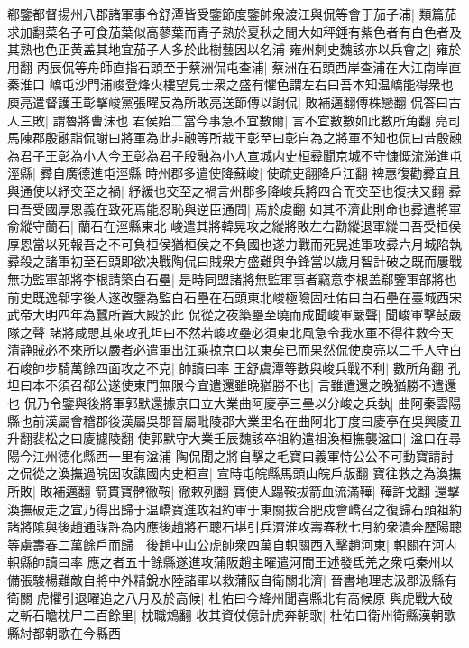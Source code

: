 郗鑒都督揚州八郡諸軍事令舒潭皆受鑒節度鑒帥衆渡江與侃等會于茄子浦|{
	類篇茄求加翻菜名子可食茄葉似高蓼葉而青子熟於夏秋之間大如秤錘有紫色者有白色者及其熟也色正黄盖其地宜茄子人多於此樹藝因以名浦}
雍州刺史魏該亦以兵會之|{
	雍於用翻}
丙辰侃等舟師直指石頭至于蔡洲侃屯查浦|{
	蔡洲在石頭西岸查浦在大江南岸直秦淮口}
嶠屯沙門浦峻登烽火樓望見士衆之盛有懼色謂左右曰吾本知温嶠能得衆也庾亮遣督護王彰擊峻黨張曜反為所敗亮送節傳以謝侃|{
	敗補邁翻傳株戀翻}
侃答曰古人三敗|{
	謂魯將曹沬也}
君侯始二當今事急不宜數爾|{
	言不宜數數如此數所角翻}
亮司馬陳郡殷融詣侃謝曰將軍為此非融等所裁王彰至曰彰自為之將軍不知也侃曰昔殷融為君子王彰為小人今王彰為君子殷融為小人宣城内史桓彛聞京城不守慷慨流涕進屯涇縣|{
	彛自廣德進屯涇縣}
時州郡多遣使降蘇峻|{
	使疏吏翻降戶江翻}
禆惠復勸彛宜且與通使以紓交至之禍|{
	紓緩也交至之禍言州郡多降峻兵將四合而交至也復扶又翻}
彛曰吾受國厚恩義在致死焉能忍恥與逆臣通問|{
	焉於䖍翻}
如其不濟此則命也彛遣將軍俞縱守蘭石|{
	蘭石在涇縣東北}
峻遣其將韓晃攻之縱將敗左右勸縱退軍縱曰吾受桓侯厚恩當以死報吾之不可負桓侯猶桓侯之不負國也遂力戰而死晃進軍攻彛六月城陷執彛殺之諸軍初至石頭即欲决戰陶侃曰賊衆方盛難與争鋒當以歲月智計破之既而屢戰無功監軍部將李根請築白石壘|{
	是時同盟諸將無監軍事者竊意李根盖郗鑒軍部將也前史既逸郗字後人遂改鑒為監白石壘在石頭東北峻極險固杜佑曰白石壘在臺城西宋武帝大明四年為蠶所置大殿於此}
侃從之夜築壘至曉而成聞峻軍嚴聲|{
	聞峻軍擊鼔嚴隊之聲}
諸將咸愳其來攻孔坦曰不然若峻攻壘必須東北風急令我水軍不得往救今天清静賊必不來所以嚴者必遣軍出江乘掠京口以東矣已而果然侃使庾亮以二千人守白石峻帥步騎萬餘四面攻之不克|{
	帥讀曰率}
王舒虞潭等數與峻兵戰不利|{
	數所角翻}
孔坦曰本不須召郗公遂使東門無限今宜遣還雖晩猶勝不也|{
	言雖遣還之晚猶勝不遣還也}
侃乃令鑒與後將軍郭默還據京口立大業曲阿庱亭三壘以分峻之兵埶|{
	曲阿秦雲陽縣也前漢屬會稽郡後漢屬吳郡晉屬毗陵郡大業里名在曲阿北丁度曰庱亭在吳興庱丑升翻裴松之曰庱攄陵翻}
使郭默守大業壬辰魏該卒祖約遣祖渙桓撫襲湓口|{
	湓口在尋陽今江州德化縣西一里有湓浦}
陶侃聞之將自擊之毛寶曰義軍恃公公不可動寶請討之侃從之渙撫過皖因攻譙國内史桓宣|{
	宣時屯皖縣馬頭山皖戶版翻}
寶往救之為渙撫所敗|{
	敗補邁翻}
箭貫寶髀徹鞍|{
	徹敕列翻}
寶使人蹋鞍拔箭血流滿鞾|{
	鞾許戈翻}
還擊渙撫破走之宣乃得出歸于温嶠寶進攻祖約軍于東關拔合肥戍會嶠召之復歸石頭祖約諸將隂與後趙通謀許為内應後趙將石聰石堪引兵濟淮攻壽春秋七月約衆潰奔歷陽聰等虜壽春二萬餘戶而歸　後趙中山公虎帥衆四萬自軹關西入擊趙河東|{
	軹關在河内軹縣帥讀曰率}
應之者五十餘縣遂進攻蒲阪趙主曜遣河間王述發氐羌之衆屯秦州以備張駿楊難敵自將中外精銳水陸諸軍以救蒲阪自衛關北濟|{
	晉書地理志汲郡汲縣有衛關}
虎懼引退曜追之八月及於高候|{
	杜佑曰今絳州聞喜縣北有高候原}
與虎戰大破之斬石瞻枕尸二百餘里|{
	枕職鴆翻}
收其資仗億計虎奔朝歌|{
	杜佑曰衛州衛縣漢朝歌縣紂都朝歌在今縣西}
